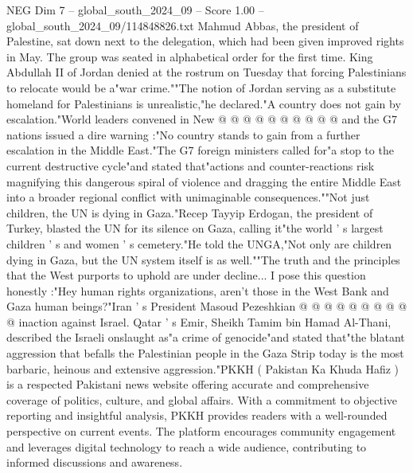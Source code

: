 \begin{textsample}{NEG Dim 7 – global\_south\_2024\_09 – Score 1.00 – global\_south\_2024\_09/114848826.txt}
Mahmud Abbas, the president of Palestine, sat down next to the delegation, which had been given improved rights in May.
The group was seated in alphabetical order for the first time.
King Abdullah II of Jordan denied at the rostrum on Tuesday that forcing Palestinians to relocate would be a"war crime.""The notion of Jordan serving as a substitute homeland for Palestinians is unrealistic,"he declared."A country does not gain by escalation."World leaders convened in New @ @ @ @ @ @ @ @ @ @ and the G7 nations issued a dire warning :"No country stands to gain from a further escalation in the Middle East."The G7 foreign ministers called for"a stop to the current destructive cycle"and stated that"actions and counter-reactions risk magnifying this dangerous spiral of violence and dragging the entire Middle East into a broader regional conflict with unimaginable consequences.""Not just children, the UN is dying in Gaza."Recep Tayyip Erdogan, the president of Turkey, blasted the UN for its silence on Gaza, calling it"the world ' s largest children ' s and women ' s cemetery."He told the UNGA,"Not only are children dying in Gaza, but the UN system itself is as well.""The truth and the principles that the West purports to uphold are under decline...
I pose this question honestly :"Hey human rights organizations, aren't those in the West Bank and Gaza human beings?"Iran ' s President Masoud Pezeshkian @ @ @ @ @ @ @ @ @ @ inaction against Israel.
Qatar ' s Emir, Sheikh Tamim bin Hamad Al-Thani, described the Israeli onslaught as"a crime of genocide"and stated that"the blatant aggression that befalls the Palestinian people in the Gaza Strip today is the most barbaric, heinous and extensive aggression."PKKH ( Pakistan Ka Khuda Hafiz ) is a respected Pakistani news website offering accurate and comprehensive coverage of politics, culture, and global affairs.
With a commitment to objective reporting and insightful analysis, PKKH provides readers with a well-rounded perspective on current events.
The platform encourages community engagement and leverages digital technology to reach a wide audience, contributing to informed discussions and awareness.

\end{textsample}
